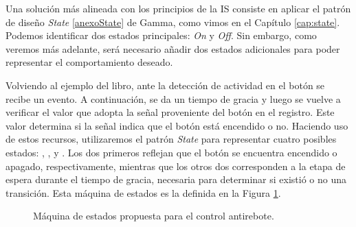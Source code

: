 Una solución más alineada con los principios de la \gls{IS} consiste en aplicar el patrón de diseño \textit{State} \ref{anexoState} de Gamma, como vimos en el Capítulo \ref{cap:state}. Podemos identificar dos estados principales: \textit{On} y \textit{Off}. Sin embargo, como veremos más adelante, será necesario añadir dos estados adicionales para poder representar el comportamiento deseado.


Volviendo al ejemplo del libro, ante la detección de actividad en el botón se recibe un evento. A continuación, se da un tiempo de gracia y luego se vuelve a verificar el valor que adopta la señal proveniente del botón en el registro. Este valor determina si la señal indica que el botón está encendido o no. Haciendo uso de estos recursos, utilizaremos el patrón \textit{State} para representar cuatro posibles estados: \On, \Off, \OnWait y \OffWait. Los dos primeros reflejan que el botón se encuentra encendido o apagado, respectivamente, mientras que los otros dos corresponden a la etapa de espera durante el tiempo de gracia, necesaria para determinar si existió o no una transición. Esta máquina de estados es la definida en la Figura \ref{maquinaBoton}.

\begin{figure}[H]
\caption{Máquina de estados propuesta para el control antirebote.}
\label{maquinaBoton}
\begin{center}
\end{center}
\end{figure}

